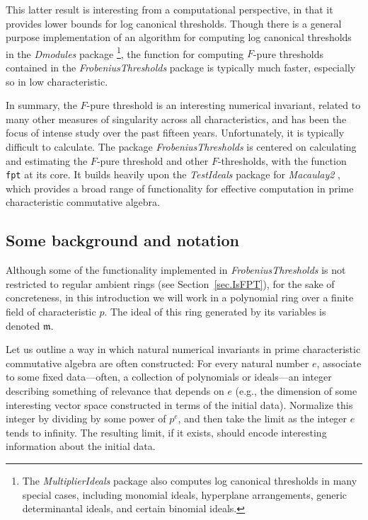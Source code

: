 \documentclass{amsart}
\newcommand{\idealm}{\mathfrak{m}}
\begin{document}
This latter result is interesting from a computational perspective, in that it provides lower bounds for log canonical thresholds.
Though there is a general purpose implementation of an algorithm for computing log canonical thresholds in the \emph{Dmodules} package \cite{DmodulesSource}\footnote{The \emph{MultiplierIdeals} package \cite{MultiplierIdealsPackage, MultiplierIdealsArticle} also computes log canonical thresholds in many special cases, including monomial ideals, hyperplane arrangements, generic determinantal ideals, and certain binomial ideals.
}, the function for computing $F$-pure thresholds contained in the \emph{FrobeniusThresholds} package is typically much faster, especially so in low characteristic.

In summary,  the $F$-pure threshold is an interesting numerical invariant, related to many other measures of singularity across all characteristics, and has been the focus of intense study over the past fifteen years.
Unfortunately, it is typically difficult to calculate.
The package \emph{FrobeniusThresholds} is centered on calculating and estimating the $F$-pure threshold and other $F$-thresholds, with the function \texttt{fpt} at its core.
It builds heavily upon the \emph{TestIdeals} package for \emph{Macaulay2} \cite{TestIdealsPackage, TestIdealsPaper}, which provides a broad range of functionality for effective computation in prime characteristic commutative algebra.

\subsection{Some background and notation}
Although some of the functionality implemented in \emph{FrobeniusThresholds} is not restricted to regular ambient rings (see Section~\ref{sec.IsFPT}), for the sake of concreteness, in this introduction  we will work in a polynomial ring over a finite field of  characteristic $p$.
The ideal of this ring generated by its variables is denoted $\idealm$.

Let us outline a way in which natural numerical invariants in prime characteristic commutative algebra are often constructed:  For every natural number $e$, associate to some fixed data---often, a collection of polynomials or ideals---an integer describing something of relevance that depends on $e$ (e.g., the dimension of some interesting vector space constructed in terms of the initial data).
Normalize this integer by dividing by some power of $p^e$, and then take the limit as the integer $e$ tends to infinity.
The resulting limit, if it exists, should encode interesting information about the initial data.
\end{document}
